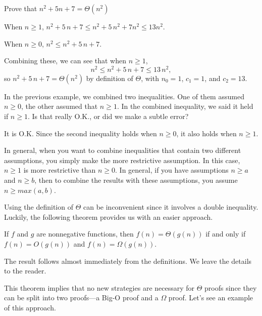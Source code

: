 \begin{exa}
Prove that $n^2+5n+7=\Theta(n^2)$
\begin{pf}
When $n\geq 1$, $n^2+5\,n+7\leq n^2+5\,n^2+7n^2\leq 13n^2.$

\noindent
When $n\geq 0$,  $n^2\leq n^2+5\,n+7$.

\noindent
Combining these, we can see that when $n\geq 1$, 
$$n^2\leq n^2+5\,n+7\leq 13\,n^2,$$
so $n^2{+}5\,n{+}7=\Theta(n^2)$ by definition of $\Theta$, 
with $n_0{=}1$, $c_1{=}1$, and $c_2{=}13$.
\end{pf}
\end{exa}

\begin{ques}
In the previous example, we combined two inequalities.  One of them assumed $n\geq 0$, the other
assumed that $n\geq 1$.  In the combined inequality, we said it held if $n\geq 1$.  
Is that really O.K., or did we make a subtle error?

\noindent
\answerlinetwo
\begin{answer}
It is O.K.  Since the second inequality holds when $n\geq 0$, it also holds when $n\geq 1$.

In general, when you want to combine inequalities that contain two different assumptions, 
you simply make the more restrictive assumption.  In this case, $n\geq 1$ is more restrictive
than $n\geq 0$.  In general, if you have assumptions $n\geq a$ and $n\geq b$, then to combine
the results with these assumptions, you assume $n\geq max(a,b)$.
\end{answer}
\end{ques}


Using the definition of $\Theta$ can be inconvenient since it involves a double inequality.  Luckily, the
following theorem provides us with an easier approach. 

\begin{thm}\label{thm:theta}
If $f$ and $g$ are nonnegative functions, then $f(n) = \Theta(g(n))$ if and only if $f(n) = O(g(n))$ and $f(n) = \Omega(g(n))$.
\begin{pf}
The result follows almost immediately from the definitions.  We leave the details to the reader.
\end{pf}
\end{thm}

This theorem implies that no new strategies are necessary for $\Theta$ proofs 
since they can be split into two proofs---a Big-O proof and a $\Omega$ proof.
Let's see an example of this approach.

